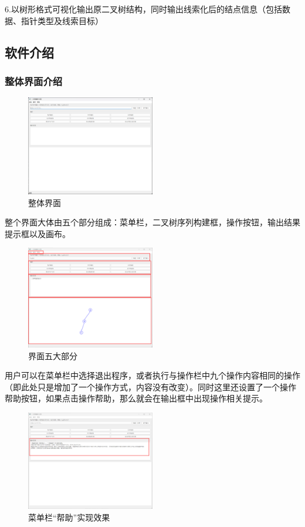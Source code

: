 \documentclass[12pt,a4paper]{article}
\begin{document}
6.以树形格式可视化输出原二叉树结构，同时输出线索化后的结点信息（包括数据、指针类型及线索目标）

\subsection{软件介绍}
\subsubsection{整体界面介绍}
\begin{figure}[H]
    \centering
    \includegraphics[width=0.5\textwidth]{pt1-1.png}
    \caption{整体界面}
\end{figure}
整个界面大体由五个部分组成：菜单栏，二叉树序列构建框，操作按钮，输出结果提示框以及画布。
\begin{figure}[H]
    \centering
    \includegraphics[width=0.5\textwidth]{pt1-2.png}
    \caption{界面五大部分}
\end{figure}
用户可以在菜单栏中选择退出程序，或者执行与操作栏中九个操作内容相同的操作（即此处只是增加了一个操作方式，内容没有改变）。同时这里还设置了一个操作帮助按钮，如果点击操作帮助，那么就会在输出框中出现操作相关提示。
\begin{figure}[H]
    \centering
    \includegraphics[width=0.5\textwidth]{pt1-3.png}
    \caption{菜单栏“帮助”实现效果}
\end{figure}
\end{document}
